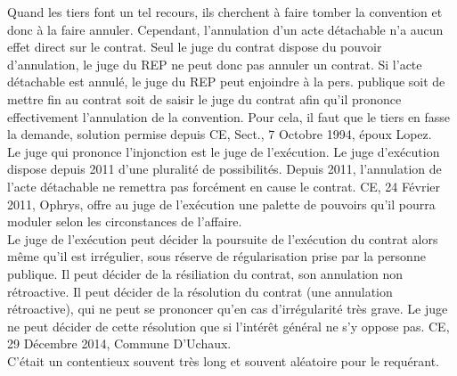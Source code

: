 \documentclass[10pt, a4paper, openany]{book}
\begin{document}
Quand les tiers font un tel recours, ils cherchent à faire tomber la convention et donc à la faire annuler. Cependant, l'annulation d'un acte détachable n'a aucun effet direct sur le contrat. Seul le juge du contrat dispose du pouvoir d'annulation, le juge du REP ne peut donc pas annuler un contrat. Si l'acte détachable est annulé, le juge du REP peut enjoindre à la pers. publique soit de mettre fin au contrat soit de saisir le juge du contrat afin qu'il prononce effectivement l'annulation de la convention. Pour cela, il faut que le tiers en fasse la demande, solution permise depuis CE, Sect., 7 Octobre 1994, époux Lopez. \\
Le juge qui prononce l'injonction est le juge de l'exécution. Le juge d'exécution dispose depuis 2011 d'une pluralité de possibilités. Depuis 2011, l'annulation de l'acte détachable ne remettra pas forcément en cause le contrat. CE, 24 Février 2011, Ophrys, offre au juge de l'exécution une palette de pouvoirs qu'il pourra moduler selon les circonstances de l'affaire. \\
Le juge de l'exécution peut décider la poursuite de l'exécution du contrat alors même qu'il est irrégulier, sous réserve de régularisation prise par la personne publique. Il peut décider de la résiliation du contrat, son annulation non rétroactive. Il peut décider de la résolution du contrat (une annulation rétroactive), qui ne peut se prononcer qu'en cas d'irrégularité très grave. Le juge ne peut décider de cette résolution que si l'intérêt général ne s'y oppose pas. CE, 29 Décembre 2014, Commune D'Uchaux. \\
C'était un contentieux souvent très long et souvent aléatoire pour le requérant. 
\end{document}
